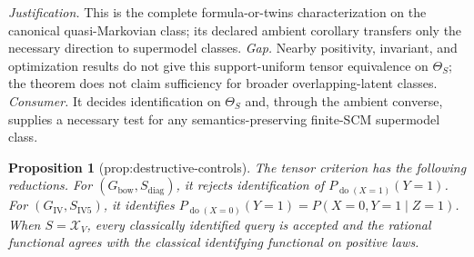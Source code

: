 \documentclass{article}
\newtheorem{proposition}{Proposition}
\begin{document}
\par\smallskip\noindent \textit{Justification.} This is the complete formula-or-twins characterization on the canonical quasi-Markovian class; its declared ambient corollary transfers only the necessary direction to supermodel classes. \textit{Gap.} Nearby positivity, invariant, and optimization results do not give this support-uniform tensor equivalence on \(\Theta_S\); the theorem does not claim sufficiency for broader overlapping-latent classes. \textit{Consumer.} It decides identification on \(\Theta_S\) and, through the ambient converse, supplies a necessary test for any semantics-preserving finite-SCM supermodel class.

\begin{proposition}[prop:destructive-controls]\label{prop:destructive-controls}
The tensor criterion has the following reductions. For \((G_{\mathrm{bow}},S_{\mathrm{diag}})\), it rejects identification of \(P_{\operatorname{do}(X=1)}(Y=1)\). For \((G_{\mathrm{IV}},S_{\mathrm{IV5}})\), it identifies \(P_{\operatorname{do}(X=0)}(Y=1)=P(X=0,Y=1\mid Z=1)\). When \(S=\mathcal X_V\), every classically identified query is accepted and the rational functional agrees with the classical identifying functional on positive laws.
\end{proposition}
\end{document}

